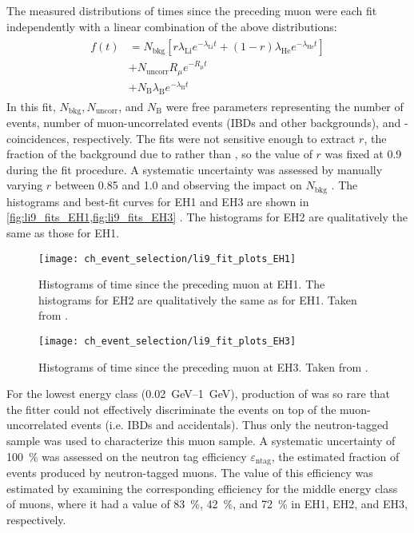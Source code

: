 The measured distributions of times since the preceding muon
were each fit independently with a linear combination of the above distributions:
\begin{align}\label{eq:li9_fit_fn}
    \begin{split}
        f(t) &= N_\text{bkg} \left[r \lambda_\text{Li} e^{-\lambda_\text{Li} t}
        + (1-r) \lambda_\text{He} e^{-\lambda_\text{He} t}\right] \\
             &+ N_\text{uncorr} R_\mu e^{-R_\mu t} \\
             &+ N_\text{B} \lambda_\text{B} e^{-\lambda_\text{B} t}
    \end{split}
\end{align}
In this fit, $N_\text{bkg}, N_\text{uncorr}$, and $N_\text{B}$
were free parameters representing the number of \li{} events,
number of muon-uncorrelated events (IBDs and other backgrounds),
and \boron{}-\boron{} coincidences, respectively.
The fits were not sensitive enough to extract $r$,
the fraction of the background due to \li{} rather than \he{},
so the value of $r$ was fixed at 0.9 during the fit procedure.
A systematic uncertainty was assessed by manually varying $r$
between 0.85 and 1.0
and observing the impact on $N_\text{bkg}$ \cite{li9_details}.
The histograms and best-fit curves for EH1 and EH3 are shown
in \cref{fig:li9_fits_EH1,fig:li9_fits_EH3} \cite{jinjing_2020may}.
The histograms for EH2 are qualitatively the same as those for EH1.

\begin{figure}
    \centering
    \texttt{[image: ch\_event\_selection/li9\_fit\_plots\_EH1]}
    \caption[Time-since-muon histograms for EH1]{
        Histograms of time since the preceding muon at EH1.
        The histograms for EH2 are qualitatively the same as for EH1.
        Taken from \cite{jinjing_2020may}.
    }
    \label{fig:li9_fits_EH1}
\end{figure}

\begin{figure}
    \centering
    \texttt{[image: ch\_event\_selection/li9\_fit\_plots\_EH3]}
    \caption[Time-since-muon histograms for EH3]{
        Histograms of time since the preceding muon at EH3.
        Taken from \cite{jinjing_2020may}.
    }
    \label{fig:li9_fits_EH3}
\end{figure}

For the lowest energy class (\SIrange{0.02}{1}{\GeV}),
production of \li{} was so rare that the fitter
could not effectively discriminate the \li{} events
on top of the muon-uncorrelated events (i.e. IBDs and accidentals).
Thus only the neutron-tagged sample was used to characterize this muon sample.
A systematic uncertainty of \SI{100}{\percent} was assessed
on the neutron tag efficiency $\varepsilon_\text{ntag}$,
the estimated fraction of \li{} events produced by neutron-tagged muons.
The value of this efficiency was estimated by examining
the corresponding efficiency for the middle energy class of muons,
where it had a value of \SI{83}{\percent}, \SI{42}{\percent}, and \SI{72}{\percent}
in EH1, EH2, and EH3, respectively.

